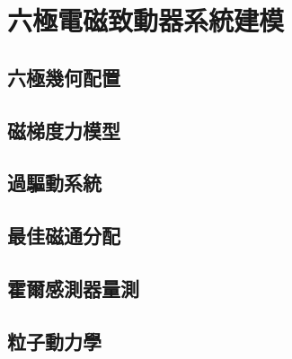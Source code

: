\chapter{六極電磁致動器系統建模}
\label{c:modeling}

\section{六極幾何配置}
\label{sec:hexapole_geometry}


\section{磁梯度力模型}
\label{sec:force_model}


\section{過驅動系統}
\label{sec:overactuated}


\section{最佳磁通分配}
\label{sec:optimal_allocation}


\section{霍爾感測器量測}
\label{sec:hall_sensor}


\section{粒子動力學}
\label{sec:particle_dynamics}

